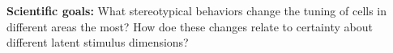\documentclass[B2,COG]{ercgrant}
\begin{document}

\textbf{Scientific goals:} What stereotypical behaviors change the tuning of cells in different areas the most? How doe these changes relate to certainty about different latent stimulus dimensions?

\end{document}
